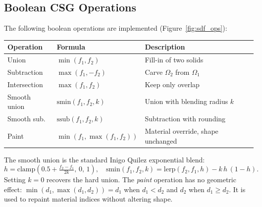 \documentclass[10pt,a4paper]{article}
\begin{document}
\subsection{Boolean CSG Operations}
\label{sec:sdf:ops}

The following boolean operations are implemented (Figure~\ref{fig:sdf_ops}):

\begin{center}
\begin{tabular}{lll}
  \toprule
  Operation & Formula & Description\\
  \midrule
  Union        & $\min(f_1, f_2)$              & Fill-in of two solids \\
  Subtraction  & $\max(f_1, -f_2)$             & Carve $\Omega_2$ from $\Omega_1$\\
  Intersection & $\max(f_1, f_2)$              & Keep only overlap \\
  Smooth union & $\text{smin}(f_1,f_2,k)$      & Union with blending radius $k$\\
  Smooth sub.  & $\text{ssub}(f_1,f_2,k)$      & Subtraction with rounding\\
  Paint        & $\min(f_1,\max(f_1,f_2))$     & Material override, shape unchanged\\
  \bottomrule
\end{tabular}
\end{center}

The smooth union is the standard Inigo Quilez exponential blend:
\[
  h = \text{clamp}\!\left(0.5 + \tfrac{f_2-f_1}{2k},\,0,\,1\right),
  \quad
  \text{smin}(f_1,f_2,k) = \text{lerp}(f_2,f_1,h) - k\,h\,(1-h).
\]
Setting $k=0$ recovers the hard union.  The \emph{paint} operation has
no geometric effect: $\min(d_1,\max(d_1,d_2)) = d_1$ when $d_1 < d_2$
and $d_2$ when $d_1 \geq d_2$.  It is used to repaint material indices
without altering shape.
\end{document}
